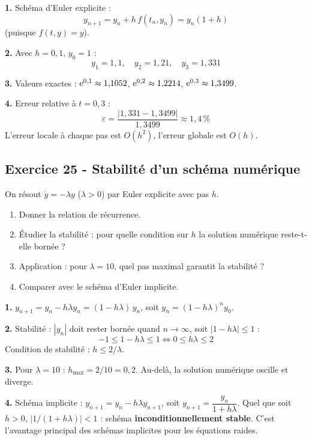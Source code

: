 \documentclass[12pt,a4paper]{article}
\begin{document}
\begin{boitecorrige}
\textbf{1.} Schéma d'Euler explicite :
\[
y_{n+1} = y_n + h\,f(t_n, y_n) = y_n(1 + h)
\]
(puisque $f(t,y) = y$).

\textbf{2.} Avec $h = 0{,}1$, $y_0 = 1$ :
\[
y_1 = 1{,}1, \quad y_2 = 1{,}21, \quad y_3 = 1{,}331
\]

\textbf{3.} Valeurs exactes : $\mathrm{e}^{0{,}1} \approx 1{,}1052$, $\mathrm{e}^{0{,}2} \approx 1{,}2214$, $\mathrm{e}^{0{,}3} \approx 1{,}3499$.

\textbf{4.} Erreur relative à $t = 0{,}3$ :
\[
\varepsilon = \frac{|1{,}331 - 1{,}3499|}{1{,}3499} \approx 1{,}4\,\%
\]
L'erreur locale à chaque pas est $O(h^2)$, l'erreur globale est $O(h)$.
\end{boitecorrige}

\subsection*{Exercice 25 - Stabilité d'un schéma numérique \niveau{\moyen}}

\begin{boiteexercice}
On résout $\dot y = -\lambda y$ ($\lambda > 0$) par Euler explicite avec pas $h$.
\begin{enumerate}
  \item Donner la relation de récurrence.
  \item Étudier la stabilité : pour quelle condition sur $h$ la solution numérique reste-t-elle bornée ?
  \item Application : pour $\lambda = 10$, quel pas maximal garantit la stabilité ?
  \item Comparer avec le schéma d'Euler implicite.
\end{enumerate}
\end{boiteexercice}

\begin{boitecorrige}
\textbf{1.} $y_{n+1} = y_n - h\lambda y_n = (1 - h\lambda)\,y_n$, soit $y_n = (1 - h\lambda)^n y_0$.

\textbf{2.} Stabilité : $|y_n|$ doit rester bornée quand $n\to\infty$, soit $|1 - h\lambda| \leq 1$ :
\[
-1 \leq 1 - h\lambda \leq 1 \iff 0 \leq h\lambda \leq 2
\]
Condition de stabilité : $\boxed{h \leq 2/\lambda}$.

\textbf{3.} Pour $\lambda = 10$ : $h_\text{max} = 2/10 = 0{,}2$. Au-delà, la solution numérique oscille et diverge.

\textbf{4.} Schéma implicite : $y_{n+1} = y_n - h\lambda y_{n+1}$, soit $y_{n+1} = \dfrac{y_n}{1 + h\lambda}$. Quel que soit $h > 0$, $|1/(1+h\lambda)| < 1$ : schéma \textbf{inconditionnellement stable}. C'est l'avantage principal des schémas implicites pour les équations raides.
\end{boitecorrige}
\end{document}
